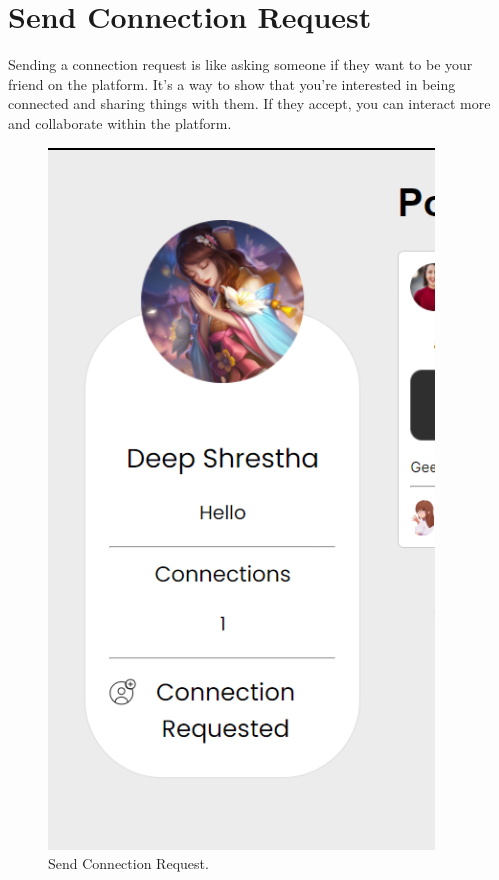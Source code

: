 \section{Send Connection Request}
Sending a connection request is like asking someone if they want to be your friend on the platform. It's a way to show that you're interested in being connected and sharing things with them. If they accept, you can interact more and collaborate within the platform.
\begin{figure}[ht]
    \centering
    \includegraphics[height=0.3\textheight]{Outcome-ss/connection-request.png}
    \caption{Send Connection Request.}
    \label{fig:Send Connection Request}
\end{figure}
